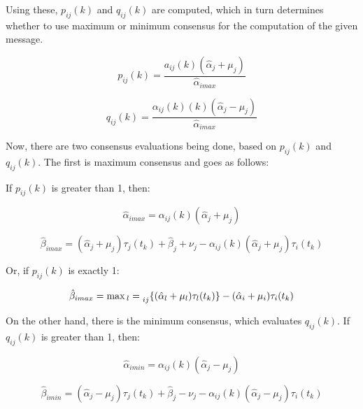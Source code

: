 \documentclass[a4paper,12pt]{article}
\begin{document}
    Using these, $p_{ij}(k)$ and $q_{ij}(k)$ are computed, which in turn determines whether to use maximum or minimum consensus for the computation of the given message.
    
    \begin{equation}
        p_{ij}(k) = \frac{a_{ij}(k)(\hat{\alpha}_j + \mu_j)}{\hat{\alpha}_{imax}}
    \end{equation}
    
    \begin{equation}
        q_{ij}(k) = \frac{\alpha_{ij}(k) (k) (\hat{\alpha}_j - \mu_j)}{\hat{\alpha}_{imax}}
    \end{equation}
    
    Now, there are two consensus evaluations being done, based on $p_{ij}(k)$ and $q_{ij}(k)$. The first is maximum consensus and goes as follows:
    
    If $p_{ij}(k)$ is greater than 1, then:
    
    \begin{equation}
        \hat{\alpha}_{imax} = \alpha_{ij}(k)(\hat{\alpha}_j + \mu_j)
    \end{equation}
    
    \begin{equation}
        \hat{\beta}_{imax} = (\hat{\alpha}_j + \mu_j) \tau_j(t_k) + \hat{\beta}_j + \nu_j - \alpha_{ij}(k)(\hat{\alpha}_j + \mu_j) \tau_i(t_k)
    \end{equation}
    
    Or, if $p_{ij}(k)$ is exactly 1:
    
    \begin{equation}
        \hat{\beta}_{imax} = \max{_l} = \prescript{}{ij}{\{ ( \hat{\alpha}_l + \mu_l ) \tau_l(t_k) \}} - ( \hat{\alpha}_i + \mu_i ) \tau_i(t_k)
    \end{equation}
    
    On the other hand, there is the minimum consensus, which evaluates $q_{ij}(k)$. If $q_{ij}(k)$ is greater than 1, then:
    
    \begin{equation}
        \hat{\alpha}_{imin} = \alpha_{ij}(k)(\hat{\alpha}_j - \mu_j)
    \end{equation}
    
    \begin{equation}
        \hat{\beta}_{imin} = ( \hat{\alpha}_j - \mu_j ) \tau_j(t_k) + \hat{\beta}_j - \nu_j - \alpha_{ij}(k)(\hat{\alpha}_j - \mu_j)\tau_i(t_k)
    \end{equation}
    
\end{document}
